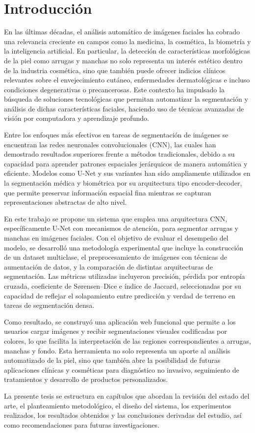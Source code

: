 
\chapter*{Introducción}
En las últimas décadas, el análisis automático de imágenes faciales ha cobrado una relevancia creciente en campos como la medicina, la cosmética, la biometría y la inteligencia artificial. En particular, la detección de características morfológicas de la piel como arrugas y manchas no solo representa un interés estético dentro de la industria cosmética, sino que también puede ofrecer indicios clínicos relevantes sobre el envejecimiento cutáneo, enfermedades dermatológicas e incluso condiciones degenerativas o precancerosas. Este contexto ha impulsado la búsqueda de soluciones tecnológicas que permitan automatizar la segmentación y análisis de dichas características faciales, haciendo uso de técnicas avanzadas de visión por computadora y aprendizaje profundo.

Entre los enfoques más efectivos en tareas de segmentación de imágenes se encuentran las redes neuronales convolucionales (CNN), las cuales han demostrado resultados superiores frente a métodos tradicionales, debido a su capacidad para aprender patrones espaciales jerárquicos de manera automática y eficiente. Modelos como U-Net y sus variantes han sido ampliamente utilizados en la segmentación médica y biométrica por su arquitectura tipo encoder-decoder, que permite preservar información espacial fina mientras se capturan representaciones abstractas de alto nivel.

En este trabajo se propone un sistema que emplea una arquitectura CNN, específicamente U-Net con mecanismos de atención, para segmentar arrugas y manchas en imágenes faciales. Con el objetivo de evaluar el desempeño del modelo, se desarrolló una metodología experimental que incluye la construcción de un dataset multiclase, el preprocesamiento de imágenes con técnicas de aumentación de datos, y la comparación de distintas arquitecturas de segmentación. Las métricas utilizadas incluyeron precisión, pérdida por entropía cruzada, coeficiente de Sørensen–Dice e índice de Jaccard, seleccionadas por su capacidad de reflejar el solapamiento entre predicción y verdad de terreno en tareas de segmentación densa.

Como resultado, se construyó una aplicación web funcional que permite a los usuarios cargar imágenes y recibir segmentaciones visuales codificadas por colores, lo que facilita la interpretación de las regiones correspondientes a arrugas, manchas y fondo. Esta herramienta no solo representa un aporte al análisis automatizado de la piel, sino que también abre la posibilidad de futuras aplicaciones clínicas y cosméticas para diagnóstico no invasivo, seguimiento de tratamientos y desarrollo de productos personalizados.

La presente tesis se estructura en capítulos que abordan la revisión del estado del arte, el planteamiento metodológico, el diseño del sistema, los experimentos realizados, los resultados obtenidos y las conclusiones derivadas del estudio, así como recomendaciones para futuras investigaciones.